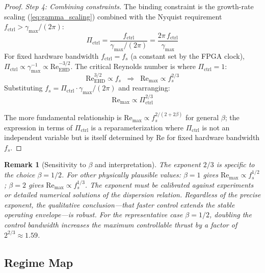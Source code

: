 \documentclass[12pt,twocolumn]{article}
\newtheorem{remark}{Remark}
\newcommand{\Reehd}{\mathrm{Re}_{\mathrm{EHD}}}
\newcommand{\Pctrl}{\Pi_{\mathrm{ctrl}}}
\begin{document}
\begin{proof}
\textit{Step 4: Combining constraints.}
The binding constraint is the growth-rate scaling (\ref{eq:gamma_scaling})
combined with the Nyquist requirement $f_{\mathrm{ctrl}} >
\gamma_{\max}/(2\pi)$:
\begin{equation}
  \Pctrl = \frac{f_{\mathrm{ctrl}}}{\gamma_{\max}/(2\pi)}
  = \frac{2\pi\,f_{\mathrm{ctrl}}}{\gamma_{\max}}
  \label{eq:Pctrl_def_again}
\end{equation}
For fixed hardware bandwidth $f_{\mathrm{ctrl}} = f_s$ (a constant
set by the FPGA clock), $\Pctrl \propto \gamma_{\max}^{-1} \propto
\Reehd^{-3/2}$. The critical Reynolds number is where $\Pctrl = 1$:
\begin{equation}
  \Reehd^{3/2} \propto f_s
  \;\;\Longrightarrow\;\;
  \mathrm{Re}_{\max} \propto f_s^{2/3}
  \label{eq:Remax_fs}
\end{equation}
Substituting $f_s = \Pctrl \cdot \gamma_{\max}/(2\pi)$ and
rearranging:
\begin{equation}
  \mathrm{Re}_{\max} \propto \Pctrl^{2/3}
  \label{eq:Remax_Pctrl}
\end{equation}

The more fundamental relationship is
$\mathrm{Re}_{\max} \propto f_s^{2/(2+2\beta)}$ for general $\beta$;
the expression in terms of $\Pctrl$ is a reparameterization where
$\Pctrl$ is not an independent variable but is itself determined by
$\mathrm{Re}$ for fixed hardware bandwidth $f_s$.
\end{proof}

\begin{remark}[Sensitivity to $\beta$ and interpretation]
\label{rem:scaling_interp}
The exponent $2/3$ is specific to the choice $\beta = 1/2$. For
other physically plausible values: $\beta = 1$ gives
$\mathrm{Re}_{\max} \propto f_s^{1/2}$; $\beta = 2$ gives
$\mathrm{Re}_{\max} \propto f_s^{1/3}$. The exponent must be
calibrated against experiments or detailed numerical solutions of
the dispersion relation. Regardless of the precise exponent, the
qualitative conclusion---that faster control extends the stable
operating envelope---is robust. For the representative case
$\beta = 1/2$, doubling the control bandwidth increases the
maximum controllable thrust by a factor of $2^{2/3} \approx 1.59$.
\end{remark}

\subsection{Regime Map}
\label{sec:numerical:regimes}
\end{document}
